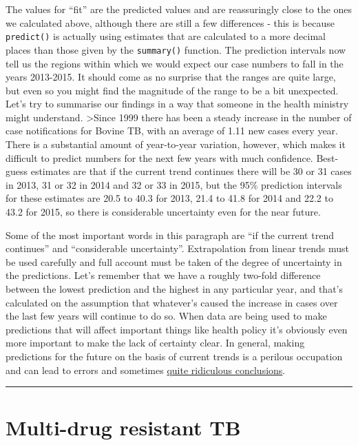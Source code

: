 \documentclass[
]{book}
\begin{document}
The values for ``fit'' are the predicted values and are reassuringly close to the ones we calculated above, although there are still a few differences - this is because \texttt{predict()} is actually using estimates that are calculated to a more decimal places than those given by the \texttt{summary()} function. The prediction intervals now tell us the regions within which we would expect our case numbers to fall in the years 2013-2015. It should come as no surprise that the ranges are quite large, but even so you might find the magnitude of the range to be a bit unexpected. Let's try to summarise our findings in a way that someone in the health ministry might understand.
\textgreater Since 1999 there has been a steady increase in the number of case notifications for Bovine TB, with an average of 1.11 new cases every year. There is a substantial amount of year-to-year variation, however, which makes it difficult to predict numbers for the next few years with much confidence. Best-guess estimates are that if the current trend continues there will be 30 or 31 cases in 2013, 31 or 32 in 2014 and 32 or 33 in 2015, but the 95\% prediction intervals for these estimates are 20.5 to 40.3 for 2013, 21.4 to 41.8 for 2014 and 22.2 to 43.2 for 2015, so there is considerable uncertainty even for the near future.

Some of the most important words in this paragraph are ``if the current trend continues'' and ``considerable uncertainty''. Extrapolation from linear trends must be used carefully and full account must be taken of the degree of uncertainty in the predictions. Let's remember that we have a roughly two-fold difference between the lowest prediction and the highest in any particular year, and that's calculated on the assumption that whatever's caused the increase in cases over the last few years will continue to do so. When data are being used to make predictions that will affect important things like health policy it's obviously even more important to make the lack of certainty clear. In general, making predictions for the future on the basis of current trends is a perilous occupation and can lead to errors and sometimes \href{http://www.nature.com/news/2004/040927/full/news040927-9.html}{quite ridiculous conclusions}.

\begin{center}\rule{0.5\linewidth}{0.5pt}\end{center}

\hypertarget{multi-drug-resistant-tb}{%
\section{Multi-drug resistant TB}\label{multi-drug-resistant-tb}}
\end{document}
